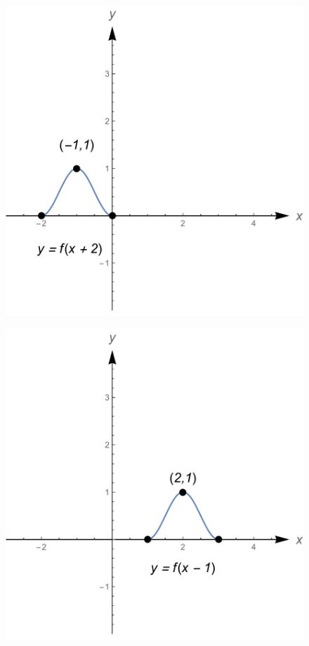 \begin{Answer}
\begin{figure}[H]
{        \hspace{0.1cm}
        \includegraphics[scale=0.3]{fig_functions_oef_8c}
        }
        \vspace{0.3cm}
        \centerline{
        \includegraphics[scale=0.3]{fig_functions_oef_8d}
}
\end{figure}
\end{Answer}

